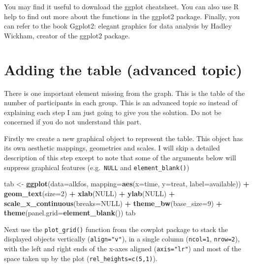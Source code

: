 \documentclass[
]{book}
\newenvironment{Shaded}{\begin{snugshade}}{\end{snugshade}}
\newcommand{\AttributeTok}[1]{\textcolor[rgb]{0.13,0.29,0.53}{#1}}
\newcommand{\ConstantTok}[1]{\textcolor[rgb]{0.56,0.35,0.01}{#1}}
\newcommand{\DecValTok}[1]{\textcolor[rgb]{0.00,0.00,0.81}{#1}}
\newcommand{\FunctionTok}[1]{\textcolor[rgb]{0.13,0.29,0.53}{\textbf{#1}}}
\newcommand{\NormalTok}[1]{#1}
\newcommand{\OtherTok}[1]{\textcolor[rgb]{0.56,0.35,0.01}{#1}}
\newcommand{\SpecialCharTok}[1]{\textcolor[rgb]{0.81,0.36,0.00}{\textbf{#1}}}
\begin{document}
You may find it useful to download the ggplot cheatsheet. You can also use R help to find out more about the functions in the ggplot2 package. Finally, you can refer to the book Ggplot2: elegant graphics for data analysis by Hadley Wickham, creator of the ggplot2 package.

\section{Adding the table (advanced topic)}\label{adding-the-table-advanced-topic}

There is one important element missing from the graph. This is the table of the number of participants in each group. This is an advanced topic so instead of explaining each step I am just going to give you the solution. Do not be concerned if you do not understand this part.

Firstly we create a new graphical object to represent the table. This object has its own aesthetic mappings, geometries and scales. I will skip a detailed description of this step except to note that some of the arguments below will suppress graphical features (e.g.~\texttt{NULL} and \texttt{element\_blank()})

\begin{Shaded}
\begin{Highlighting}[]
\NormalTok{tab }\OtherTok{\textless{}{-}} \FunctionTok{ggplot}\NormalTok{(}\AttributeTok{data=}\NormalTok{alkfos,}
              \AttributeTok{mapping=}\FunctionTok{aes}\NormalTok{(}\AttributeTok{x=}\NormalTok{time, }\AttributeTok{y=}\NormalTok{treat, }\AttributeTok{label=}\NormalTok{available)) }\SpecialCharTok{+}
              \FunctionTok{geom\_text}\NormalTok{(}\AttributeTok{size=}\DecValTok{2}\NormalTok{) }\SpecialCharTok{+} \FunctionTok{xlab}\NormalTok{(}\ConstantTok{NULL}\NormalTok{) }\SpecialCharTok{+} \FunctionTok{ylab}\NormalTok{(}\ConstantTok{NULL}\NormalTok{) }\SpecialCharTok{+}
              \FunctionTok{scale\_x\_continuous}\NormalTok{(}\AttributeTok{breaks=}\ConstantTok{NULL}\NormalTok{) }\SpecialCharTok{+}
              \FunctionTok{theme\_bw}\NormalTok{(}\AttributeTok{base\_size=}\DecValTok{9}\NormalTok{) }\SpecialCharTok{+}
              \FunctionTok{theme}\NormalTok{(}\AttributeTok{panel.grid=}\FunctionTok{element\_blank}\NormalTok{())}
\NormalTok{tab}
\end{Highlighting}
\end{Shaded}

Next use the \texttt{plot\_grid()} function from the cowplot package to stack the displayed objects vertically (\texttt{align="v"}), in a single column (\texttt{ncol=1}, \texttt{nrow=2}), with the left and right ends of the x-axes aligned (\texttt{axis="lr"}) and most of the space taken up by the plot (\texttt{rel\_heights=c(5,1)}).
\end{document}
